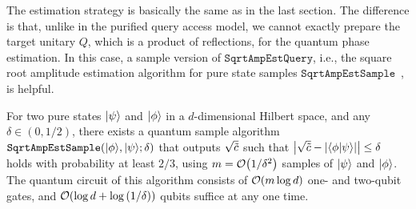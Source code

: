 


The estimation strategy is basically the same as in the last section.
The difference is that, unlike in the purified query access model, we cannot exactly prepare the target unitary $Q$, which is a product of reflections, for the quantum phase estimation.
In this case, a sample version of $\mathtt{SqrtAmpEstQuery}$, i.e., the square root amplitude estimation algorithm for pure state samples $\mathtt{SqrtAmpEstSample}$~\cite{wang2024sampleoptimal}, is helpful.

\begin{theorem}
\label{lem:square root est sample}
For two pure states $|\psi\rangle$ and $|\phi\rangle$ in a $d$-dimensional Hilbert space, and any $\delta \in (0, 1/2)$, there exists a quantum sample algorithm $\mathtt{SqrtAmpEstSample}(|\phi\rangle, |\psi\rangle; \delta)$ that outputs $\sqrt{\tilde{c}}$ such that $\big|\sqrt{\tilde{c}} - |\langle \phi \vert \psi \rangle|\big| \leq \delta$ holds with probability at least $2/3$, using $m = {\mathcal{O}}\big(1/\delta^2\big)$ samples of $|\psi\rangle$ and $|\phi\rangle$.
The quantum circuit of this algorithm consists of ${\mathcal{O}}(m\log{d})$ one- and two-qubit gates, and ${\mathcal{O}}(\log{d} + \log{(1/\delta)})$ qubits suffice at any one time.
\end{theorem}

